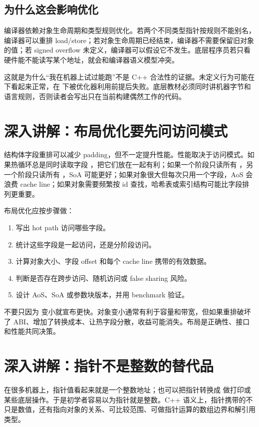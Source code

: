 \subsection{为什么这会影响优化}

编译器依赖对象生命周期和类型规则优化。若两个不同类型指针按规则不能别名，编译器可以重排 load/store；若对象生命周期已经结束，编译器不需要保留旧对象的值；若 signed overflow 未定义，编译器可以假设它不发生。底层程序员若只看硬件能不能读写某个地址，就会和编译器语义模型冲突。

这就是为什么“我在机器上试过能跑”不是 C++ 合法性的证据。未定义行为可能在  下看起来正常，在  下被优化器利用前提后失败。底层教材必须同时讲机器字节和语言规则，否则读者会写出只在当前构建偶然工作的代码。

\section{深入讲解：布局优化要先问访问模式}

结构体字段重排可以减少 padding，但不一定提升性能。性能取决于访问模式。如果热循环总是同时读取字段 ，把它们放在一起有利；如果一个阶段只读所有 ，另一个阶段只读所有 ，SoA 可能更好；如果对象很大但每次只用一个字段，AoS 会浪费 cache line；如果对象需要频繁按 id 查找，哈希表或索引结构可能比字段排列更重要。

布局优化应按步骤做：

\begin{enumerate}
  \item 写出 hot path 访问哪些字段。
  \item 统计这些字段是一起访问，还是分阶段访问。
  \item 计算对象大小、字段 offset 和每个 cache line 携带的有效数据。
  \item 判断是否存在跨步访问、随机访问或 false sharing 风险。
  \item 设计 AoS、SoA 或参数块版本，并用 benchmark 验证。
\end{enumerate}

不要只因为  变小就宣布更快。对象变小通常有利于容量和带宽，但如果重排破坏了 ABI、增加了转换成本、让热字段分散，收益可能消失。布局是正确性、接口和性能共同决策。

\section{深入讲解：指针不是整数的替代品}

在很多机器上，指针值看起来就是一个整数地址；也可以把指针转换成  做打印或某些底层操作。于是初学者容易以为指针就是整数。C++ 语义上，指针携带的不只是数值，还有指向对象的关系、可比较范围、可做指针运算的数组边界和解引用类型。

